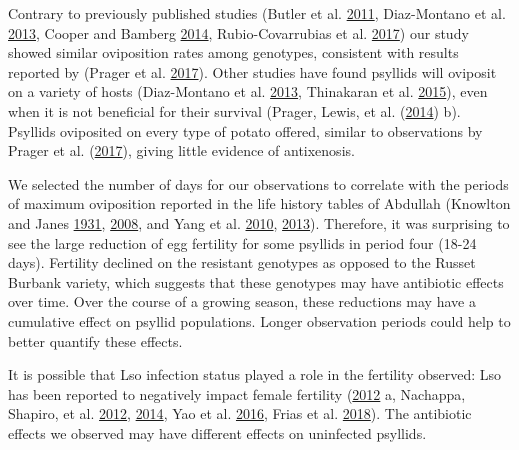 \documentclass[]{article}
\begin{document}
Contrary to previously published studies (Butler et al.
\protect\hyperlink{ref-Butler2011}{2011}, Diaz-Montano et al.
\protect\hyperlink{ref-Diaz-Montano2013}{2013}, Cooper and Bamberg
\protect\hyperlink{ref-Cooper2014}{2014}, Rubio-Covarrubias et al.
\protect\hyperlink{ref-Rubio-Covarrubias2017}{2017}) our study showed
similar oviposition rates among genotypes, consistent with results
reported by (Prager et al. \protect\hyperlink{ref-Prager2017}{2017}).
Other studies have found psyllids will oviposit on a variety of hosts
(Diaz-Montano et al. \protect\hyperlink{ref-Diaz-Montano2013}{2013},
Thinakaran et al. \protect\hyperlink{ref-Thinakaran2015}{2015}), even
when it is not beneficial for their survival (Prager, Lewis, et al.
(\protect\hyperlink{ref-Prager2014b}{2014}) b). Psyllids oviposited on
every type of potato offered, similar to observations by Prager et al.
(\protect\hyperlink{ref-Prager2017}{2017}), giving little evidence of
antixenosis.

We selected the number of days for our observations to correlate with
the periods of maximum oviposition reported in the life history tables
of Abdullah (Knowlton and Janes
\protect\hyperlink{ref-Knowlton1931}{1931},
\protect\hyperlink{ref-Abdullah2008}{2008}, and Yang et al.
\protect\hyperlink{ref-Yang2010}{2010},
\protect\hyperlink{ref-Yang2013}{2013}). Therefore, it was surprising to
see the large reduction of egg fertility for some psyllids in period
four (18-24 days). Fertility declined on the resistant genotypes as
opposed to the Russet Burbank variety, which suggests that these
genotypes may have antibiotic effects over time. Over the course of a
growing season, these reductions may have a cumulative effect on psyllid
populations. Longer observation periods could help to better quantify
these effects.

It is possible that Lso infection status played a role in the fertility
observed: Lso has been reported to negatively impact female fertility
(\protect\hyperlink{ref-Nachappa2012a}{2012} a, Nachappa, Shapiro, et
al. \protect\hyperlink{ref-Nachappa2012}{2012},
\protect\hyperlink{ref-Nachappa2014}{2014}, Yao et al.
\protect\hyperlink{ref-Yao2016}{2016}, Frias et al.
\protect\hyperlink{ref-Frias2018}{2018}). The antibiotic effects we
observed may have different effects on uninfected psyllids.
\end{document}
